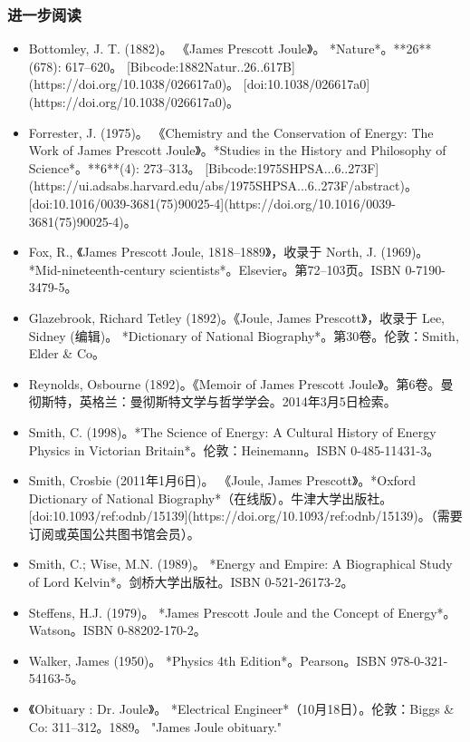 \subsubsection{进一步阅读}
\begin{itemize}
\item Bottomley, J. T. (1882)。 《James Prescott Joule》。 *Nature*。**26** (678): 617–620。 [Bibcode:1882Natur..26..617B](https://doi.org/10.1038/026617a0)。 [doi:10.1038/026617a0](https://doi.org/10.1038/026617a0)。
\item Forrester, J. (1975)。 《Chemistry and the Conservation of Energy: The Work of James Prescott Joule》。*Studies in the History and Philosophy of Science*。**6**(4): 273–313。 [Bibcode:1975SHPSA...6..273F](https://ui.adsabs.harvard.edu/abs/1975SHPSA...6..273F/abstract)。 [doi:10.1016/0039-3681(75)90025-4](https://doi.org/10.1016/0039-3681(75)90025-4)。
\item Fox, R., 《James Prescott Joule, 1818–1889》，收录于 North, J. (1969)。 *Mid-nineteenth-century scientists*。Elsevier。第72–103页。ISBN 0-7190-3479-5。
\item Glazebrook, Richard Tetley (1892)。《Joule, James Prescott》，收录于 Lee, Sidney (编辑)。 *Dictionary of National Biography*。第30卷。伦敦：Smith, Elder & Co。
\item Reynolds, Osbourne (1892)。《Memoir of James Prescott Joule》。第6卷。曼彻斯特，英格兰：曼彻斯特文学与哲学学会。2014年3月5日检索。
\item Smith, C. (1998)。*The Science of Energy: A Cultural History of Energy Physics in Victorian Britain*。伦敦：Heinemann。ISBN 0-485-11431-3。
\item Smith, Crosbie (2011年1月6日)。 《Joule, James Prescott》。*Oxford Dictionary of National Biography*（在线版）。牛津大学出版社。[doi:10.1093/ref:odnb/15139](https://doi.org/10.1093/ref:odnb/15139)。（需要订阅或英国公共图书馆会员）。
\item Smith, C.; Wise, M.N. (1989)。 *Energy and Empire: A Biographical Study of Lord Kelvin*。剑桥大学出版社。ISBN 0-521-26173-2。
\item Steffens, H.J. (1979)。 *James Prescott Joule and the Concept of Energy*。Watson。ISBN 0-88202-170-2。
\item Walker, James (1950)。 *Physics 4th Edition*。Pearson。ISBN 978-0-321-54163-5。
\item 《Obituary : Dr. Joule》。 *Electrical Engineer*（10月18日）。伦敦：Biggs & Co: 311–312。1889。 "James Joule obituary."
\end{itemize}